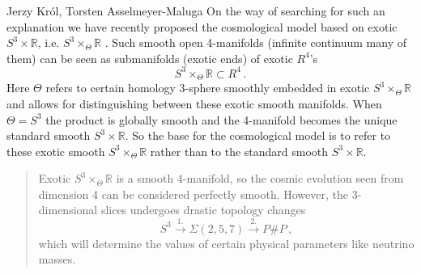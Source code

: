 \begin{artengenv2auth}{Jerzy Kr\'ol, Torsten Asselmeyer-Maluga}
On the way of searching for such an explanation we have recently proposed the cosmological model based on exotic $S^3\times \mathbb{R}$, i.e. $S^3\times_{\Theta}\mathbb{R}$ \parencite{AK2018,AK2014,AK2019}. Such smooth open 4-manifolds (infinite continuum many of them) can be seen as submanifolds (exotic ends) of exotic $R^4$'s
\[ S^3\times_{\Theta} \mathbb{R}\subset R^4\,. \]
Here $\Theta$ refers to certain homology 3-sphere smoothly embedded in exotic $S^3\times_{\Theta} \mathbb{R}$
and allows for distinguishing between these exotic smooth manifolds. When $\Theta = S^3$ the product is globally smooth and the 4-manifold becomes the unique standard smooth $S^3\times \mathbb{R}$. 
So the base for the cosmological model is to refer to these exotic smooth $S^3\times_{\Theta}\mathbb{R}$ rather than to the standard smooth $S^3\times \mathbb{R}$.
\begin{quotation}
Exotic $S^3\times_{\Theta}\mathbb{R}$ is a smooth 4-manifold, so the cosmic evolution seen from dimension 4 can be considered perfectly smooth. However, the 3-dimensional slices undergoes drastic topology changes
\begin{equation}\label{S3}S^3\overset{1.}{\to} \Sigma(2,5,7) \overset{2.}{\to}P\# P\,,  \end{equation}
which will determine the values of certain physical parameters like neutrino masses.


\end{quotation}
\end{artengenv2auth}
